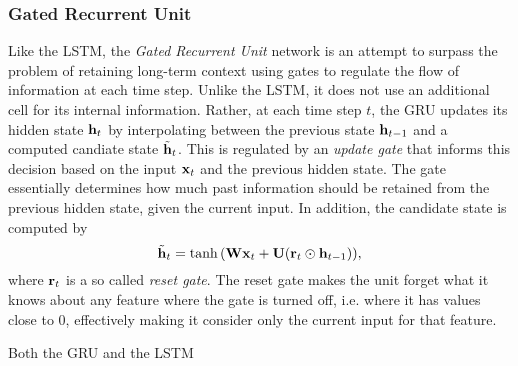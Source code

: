 \documentclass[a4paper,12pt]{article}
\begin{document}

\subsubsection{Gated Recurrent Unit}
Like the LSTM, the \textit{Gated Recurrent Unit} network is an attempt to surpass the problem of retaining long-term context using gates to regulate the flow of information at each time step. Unlike the LSTM, it does not use an additional cell for its internal information. Rather, at each time step $t$, the GRU updates its hidden state $\mathbf{ h }_{t}$ by interpolating between the previous state $\mathbf{ h }_{t - 1}$ and a computed candiate state $\tilde{\mathbf{ h }}_t$. This is regulated by an \textit{update gate} that informs this decision based on the input $\mathbf{ x }_t$ and the previous hidden state. The gate essentially determines how much past information should be retained from the previous hidden state, given the current input. In addition, the candidate state is computed by
\[\tilde{\mathbf{ h }}_t = \operatorname{tanh}{\mathopen{} \left( \mathbf{ Wx }_t + \mathbf{ U }{\mathopen{} \left( \mathbf{ r }_t \odot \mathbf{ h }_{t-1} \right) \mathclose{}} \right) \mathclose{}},\]
where $\mathbf{ r }_t$ is a so called \textit{reset gate}. The reset gate makes the unit forget what it knows about any feature where the gate is turned off, i.e. where it has values close to 0, effectively making it consider only the current input for that feature.

Both the GRU and the LSTM 

\end{document}
